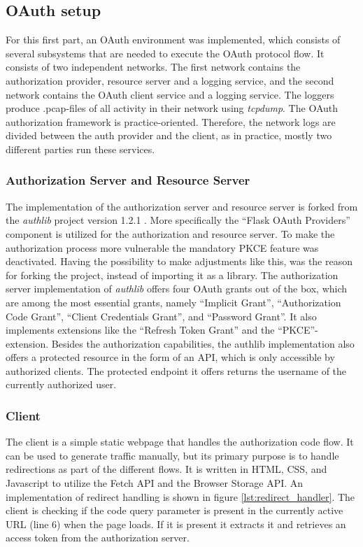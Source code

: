 \documentclass[
    fontsize=12pt,
    headings=small,
    parskip=half,           %
    bibliography=totoc,
    numbers=noenddot,       %
    open=any,               %
    ]{scrreprt}
\begin{document}
\subsection{OAuth setup}
For this first part, an OAuth environment was implemented, which consists of several subsystems that are needed to execute the OAuth protocol flow. It consists of two independent networks. The first network contains the authorization provider, resource server and a logging service, and the second network contains the OAuth client service and a logging service. The loggers produce .pcap-files of all activity in their network using \emph{tcpdump}. The OAuth authorization framework is practice-oriented. Therefore, the network logs are divided between the auth provider and the client, as in practice, mostly two different parties run these services. 

\subsubsection{Authorization Server and Resource Server}
The implementation of the authorization server and resource server is forked from the \emph{authlib} project version 1.2.1 \cite{authlib2023}. More specifically the ``Flask OAuth Providers'' component is utilized for the authorization and resource server. To make the authorization process more vulnerable the mandatory PKCE feature was deactivated. Having the possibility to make adjustments like this, was the reason for forking the project, instead of importing it as a library. The authorization server implementation of \emph{authlib} offers four OAuth grants out of the box, which are among the most essential grants, namely ``Implicit Grant'', ``Authorization Code Grant'', ``Client Credentials Grant'', and ``Password Grant''. It also implements extensions like the ``Refresh Token Grant'' and the ``PKCE''-extension. Besides the authorization capabilities, the authlib implementation also offers a protected resource in the form of an API, which is only accessible by authorized clients. The protected endpoint it offers returns the username of the currently authorized user.

\subsubsection{Client}
The client is a simple static webpage that handles the authorization code flow. It can be used to generate traffic manually, but its primary purpose is to handle redirections as part of the different flows. It is written in HTML, CSS, and Javascript to utilize the Fetch API and the Browser Storage API. An implementation of redirect handling is shown in figure \ref{lst:redirect_handler}. The client is checking if the code query parameter is present in the currently active URL (line 6) when the page loads. If it is present it extracts it and retrieves an access token from the authorization server.
\end{document}
